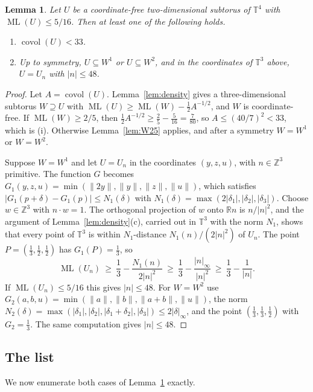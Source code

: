 \documentclass[12pt]{amsart}
\newtheorem{lemma}[theorem]{Lemma}
\theoremstyle{definition}\newtheorem{definition}[theorem]{Definition}
\theoremstyle{remark}\newtheorem{remark}[theorem]{Remark}
\newcommand{\Z}{\mathbb Z}\newcommand{\R}{\mathbb R}\newcommand{\T}{\mathbb T}
\newcommand{\norm}[1]{\lVert #1\rVert}
\newcommand{\ML}{\operatorname{ML}}
\newcommand{\covol}{\operatorname{covol}}
\newcommand{\supn}[1]{\lvert #1\rvert_\infty}
\newcommand{\eucl}[1]{\lvert #1\rvert}
\newcommand{\Wone}{W^{1}}\newcommand{\Wtwo}{W^{2}}
\begin{document}
\begin{lemma}\label{lem:reduce}
Let $U$ be a coordinate-free two-dimensional subtorus of $\T^4$ with $\ML(U)\le 5/16$. Then at least one of the following holds.
\begin{enumerate}[label=\textup{(\roman*)},leftmargin=*]
\item $\covol(U)<33$.
\item Up to symmetry, $U\subseteq\Wone$ or $U\subseteq\Wtwo$, and in the coordinates of $\T^3$ above, $U=U_n$ with $\eucl n\le 48$.
\end{enumerate}
\end{lemma}
\begin{proof}
Let $A=\covol(U)$. Lemma~\ref{lem:density} gives a three-dimensional subtorus $W\supseteq U$ with $\ML(U)\ge\ML(W)-\frac12A^{-1/2}$, and $W$ is coordinate-free. If $\ML(W)\ge 2/5$, then $\frac12A^{-1/2}\ge\frac25-\frac5{16}=\frac7{80}$, so $A\le(40/7)^2<33$, which is (i). Otherwise Lemma~\ref{lem:W25} applies, and after a symmetry $W=\Wone$ or $W=\Wtwo$.

Suppose $W=\Wone$ and let $U=U_n$ in the coordinates $(y,z,u)$, with $n\in\Z^3$ primitive. The function $G$ becomes $G_1(y,z,u)=\min(\norm{2y},\norm y,\norm z,\norm u)$, which satisfies $|G_1(p+\delta)-G_1(p)|\le N_1(\delta)$ with $N_1(\delta)=\max(2|\delta_1|,|\delta_2|,|\delta_3|)$. Choose $w\in\Z^3$ with $n\cdot w=1$. The orthogonal projection of $w$ onto $\R n$ is $n/\eucl n^2$, and the argument of Lemma~\ref{lem:density}(c), carried out in $\T^3$ with the norm $N_1$, shows that every point of $\T^3$ is within $N_1$-distance $N_1(n)/(2\eucl n^2)$ of $U_n$. The point $P=(\frac13,\frac12,\frac12)$ has $G_1(P)=\frac13$, so
\[
 \ML(U_n)\ \ge\ \frac13-\frac{N_1(n)}{2\eucl n^2}\ \ge\ \frac13-\frac{\supn n}{\eucl n^2}\ \ge\ \frac13-\frac1{\eucl n}.
\]
If $\ML(U_n)\le 5/16$ this gives $\eucl n\le 48$. For $W=\Wtwo$ use $G_2(a,b,u)=\min(\norm a,\norm b,\norm{a+b},\norm u)$, the norm $N_2(\delta)=\max(|\delta_1|,|\delta_2|,|\delta_1+\delta_2|,|\delta_3|)\le 2\supn\delta$, and the point $(\frac13,\frac13,\frac12)$ with $G_2=\frac13$. The same computation gives $\eucl n\le 48$.
\end{proof}

\subsection{The list}
We now enumerate both cases of Lemma~\ref{lem:reduce} exactly.
\end{document}
